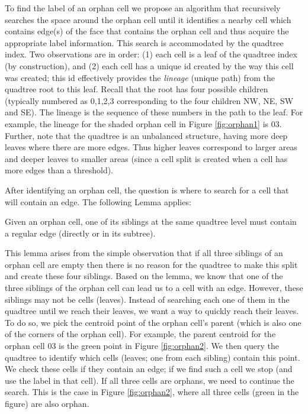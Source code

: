 To find the label of an orphan cell we propose an algorithm that recursively searches the space around the orphan cell until it identifies a nearby cell which contains edge(s) of the face that contains the orphan cell and thus acquire the appropriate label information. 
This search is accommodated by the quadtree index. 
Two observations are in order: (1) each cell is a leaf of the quadtree index (by construction), and (2) each cell has a unique id created by the way this cell was created; this id effectively provides the \textit{lineage} (unique path) from the quadtree root to this leaf. 
Recall that the root has four possible children (typically numbered as 0,1,2,3 corresponding to the four children NW, NE, SW and SE). 
The lineage is the sequence of these numbers in the path to the leaf.
For example, the lineage for the shaded orphan cell in Figure \ref{fig:orphan1} is 03.
Further, note that the quadtree is an unbalanced structure, having more deep leaves where there are more edges. Thus higher leaves correspond to larger areas and deeper leaves to smaller areas (since a cell split is created when a cell has more edges than a threshold). 

After identifying an orphan cell, the question is where to search for a cell that will contain an edge. The following Lemma applies:

\begin{lemma}\label{lem:cells}
Given an orphan cell, one of its siblings at the same quadtree level  must contain a regular edge (directly or in its subtree). 
\end{lemma}

This lemma arises from the simple observation that if all three siblings of an orphan cell are empty then there is no reason for the quadtree to make this split and create these four siblings. 
Based on the lemma, we know that one of the three siblings of the orphan cell can lead us to a cell with an edge. 
However, these siblings may not be cells (leaves). 
Instead of searching each one of them in the quadtree until we reach their leaves, we want a way to quickly reach their leaves. 
To do so, we pick the centroid point of the orphan cell's parent (which is also one of the corners of the orphan cell). 
For example, the parent centroid for the orphan cell 03 is the green point in Figure \ref{fig:orphan2}.
We then query the quadtree to identify which cells (leaves; one from each sibling) contain this point. 
We check these cells if they contain an edge; if we find such a cell we stop (and use the label in that cell).
If all three cells are orphans, we need to continue the search. This is the case in Figure \ref{fig:orphan2}, where all three cells (green in the figure) are also orphan.

